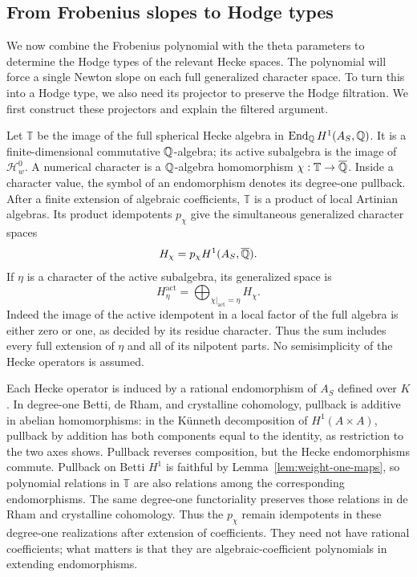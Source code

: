 \subsection{From Frobenius slopes to Hodge types}\label{subsec:slopes-to-types}

We now combine the Frobenius polynomial with the theta parameters to
determine the Hodge types of the relevant Hecke spaces. The polynomial
will force a single Newton slope on each full generalized character
space. To turn this into a Hodge type, we also need its projector to
preserve the Hodge filtration. We first construct these projectors and
explain the filtered argument.

Let \(\mathbb T\) be the image of the full spherical Hecke algebra in
\(\operatorname{End}_{\mathbb{Q}}H^1(A_S,\mathbb{Q})\). It is a finite-dimensional commutative
\(\mathbb{Q}\)-algebra; its active subalgebra is the image of
\(\mathcal H_w^0\). A numerical character is a \(\mathbb{Q}\)-algebra
homomorphism \(\chi:\mathbb T\to\overline{\mathbb{Q}}\). Inside a character value,
the symbol of an endomorphism denotes its degree-one pullback.
After a finite extension of algebraic
coefficients, \(\mathbb T\) is a product of local Artinian algebras.
Its product idempotents \(p_\chi\) give the simultaneous generalized
character spaces
\[
H_\chi=p_\chi H^1(A_S,\overline{\mathbb{Q}}).
\]
If \(\eta\) is a character of the active subalgebra, its generalized
space is
\begin{equation}\label{eq:active-generalized-space}
H^{\mathrm{act}}_\eta
=\bigoplus_{\chi|_{\mathrm{act}}=\eta}H_\chi.
\end{equation}
Indeed the image of the active idempotent in a local factor of the full
algebra is either zero or one, as decided by its residue character.
Thus the sum includes every full extension of \(\eta\) and all of its
nilpotent parts. No semisimplicity of the Hecke operators is assumed.

Each Hecke operator is induced by a rational endomorphism of \(A_S\)
defined over \(K\). In degree-one Betti, de Rham, and crystalline
cohomology, pullback is additive in abelian homomorphisms: in the
Künneth decomposition of \(H^1(A\times A)\), pullback by addition has
both components equal to the identity, as restriction to the two axes
shows. Pullback reverses composition, but the Hecke endomorphisms
commute. Pullback on Betti \(H^1\) is faithful by
Lemma~\ref{lem:weight-one-maps}, so polynomial relations in
\(\mathbb T\) are also relations among the corresponding
endomorphisms. The same degree-one functoriality preserves those
relations in de Rham and crystalline cohomology. Thus the \(p_\chi\)
remain idempotents in these degree-one
realizations after extension of coefficients. They need not have
rational coefficients; what matters is that they are
algebraic-coefficient polynomials in extending endomorphisms.

